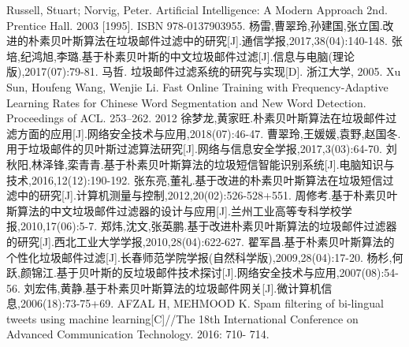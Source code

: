 \documentclass[UTF8]{ctexart}
\begin{document}
\begin{thebibliography}{99}
	Russell, Stuart; Norvig, Peter. Artificial Intelligence: A Modern Approach 2nd. Prentice Hall. 2003 [1995]. ISBN 978-0137903955.
	杨雷,曹翠玲,孙建国,张立国.改进的朴素贝叶斯算法在垃圾邮件过滤中的研究[J].通信学报,2017,38(04):140-148.
	张培,纪鸿旭,李璐.基于朴素贝叶斯的中文垃圾邮件过滤[J].信息与电脑(理论版),2017(07):79-81.
	马哲. 垃圾邮件过滤系统的研究与实现[D]. 浙江大学, 2005.
	Xu Sun, Houfeng Wang, Wenjie Li. Fast Online Training with Frequency-Adaptive Learning Rates for Chinese Word Segmentation and New Word Detection. Proceedings of ACL. 253–262. 2012
	徐梦龙,黄家旺.朴素贝叶斯算法在垃圾邮件过滤方面的应用[J].网络安全技术与应用,2018(07):46-47.
	曹翠玲,王媛媛,袁野,赵国冬.用于垃圾邮件的贝叶斯过滤算法研究[J].网络与信息安全学报,2017,3(03):64-70.
	刘秋阳,林泽锋,栾青青.基于朴素贝叶斯算法的垃圾短信智能识别系统[J].电脑知识与技术,2016,12(12):190-192.
	张东亮,董礼.基于改进的朴素贝叶斯算法在垃圾短信过滤中的研究[J].计算机测量与控制,2012,20(02):526-528+551.
	周修考.基于朴素贝叶斯算法的中文垃圾邮件过滤器的设计与应用[J].兰州工业高等专科学校学报,2010,17(06):5-7.
	郑炜,沈文,张英鹏.基于改进朴素贝叶斯算法的垃圾邮件过滤器的研究[J].西北工业大学学报,2010,28(04):622-627.
	翟军昌.基于朴素贝叶斯算法的个性化垃圾邮件过滤[J].长春师范学院学报(自然科学版),2009,28(04):17-20.
	杨杉,何跃,颜锦江.基于贝叶斯的反垃圾邮件技术探讨[J].网络安全技术与应用,2007(08):54-56.
	刘宏伟,黄静.基于朴素贝叶斯算法的垃圾邮件网关[J].微计算机信息,2006(18):73-75+69.
	AFZAL H, MEHMOOD K. Spam filtering of bi-lingual tweets using
machine learning[C]//The 18th International Conference on Advanced
Communication Technology. 2016: 710- 714.
\end{thebibliography}
\end{document}
